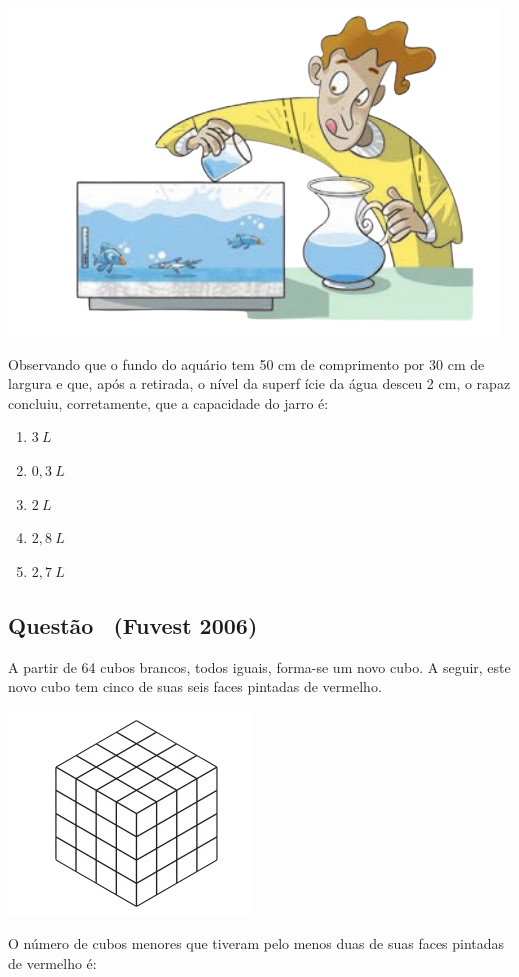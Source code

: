 \documentclass[12pt]{article}
\newcounter{questao}
\newcommand{\novaquestao}[1]{%
  \stepcounter{questao}%
  \subsection*{Questão \thequestao\ (#1)}%
}
\begin{document}
\begin{multicols}{2}
            \begin{center}
                \includegraphics[scale=0.5]{imagem/paiva-aquario.png}
            \end{center} Observando que o fundo do aquário tem 50 cm de
            comprimento por 30 cm de largura e que, após a
            retirada, o nível da superf ície da água desceu 2 cm,
            o rapaz concluiu, corretamente, que a capacidade
            do jarro é:

            \begin{enumerate}[label=(\alph*), noitemsep]
                \item $3\ L$ %
                \item $0,3\  L$
                \item $2\ L$
                \item $2,8\ L$
                \item $2,7\  L$
            \end{enumerate}

        \novaquestao{Fuvest 2006}

            A partir de 64 cubos brancos, todos iguais, forma-se um novo cubo. A seguir, este novo cubo tem cinco de suas seis faces pintadas de vermelho.

            \begin{center}
                \includegraphics[scale=0.7]{imagem/fuvest-cubo.png}
            \end{center} O número de cubos menores que tiveram pelo menos duas de suas faces pintadas de vermelho é:


\end{multicols}
\end{document}
